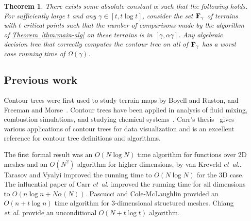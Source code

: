 \documentclass[11pt]{article}
\newcommand{\myparagraph}[1]{\paragraph{#1}}
\newtheorem{theorem}{Theorem}[section]
\theoremstyle{definition}
\newcommand{\bF}{{\bf F}}
\newcommand{\cC}{{\cal C}}
\newcommand{\MM}{\mathbb{M}}
\newcommand{\Thm}[1]{\hyperref[thm:#1]{Theorem~\ref*{thm:#1}}} %
\newcommand{\etal}{\textit{et~al.}\xspace}
\newcommand{\thmConst}{\gamma}
\begin{document}
\begin{theorem} 
\label{thm:main-lb}
There exists some absolute constant $\alpha$ such that the following holds.
For sufficiently large $t$ and any $\thmConst\in [t, t\log t]$, consider the set $\bF_\thmConst$ of terrains with $t$ critical points such that
the number of comparisons made by the algorithm of \Thm{main-alg} on these terrains is in $[\thmConst,\alpha \thmConst]$.
Any algebraic decision tree that correctly computes
the contour tree on all of $\bF_\thmConst$ has a worst case running time of $\Omega(\thmConst)$.
\end{theorem}
% 
% 

\subsection{Previous work}

Contour trees were first used to study terrain maps by Boyell and Ruston, and Freeman and Morse~\cite{BoRu63,FrMo67}.
Contour trees have been applied in analysis of fluid mixing, combustion simulations,
and studying chemical systems~\cite{LaBe+06,BrWe+10,BeWe+11,BrWe+11,MaGr+11}. Carr's thesis~\cite{c-tmi-04} gives various
applications of contour trees for data visualization and is an excellent reference for contour tree definitions and algorithms.

The first formal result was an $O(N\log N)$ time algorithm for functions over 2D 
meshes and an $O(N^2)$ algorithm for higher dimensions, by van Kreveld \etal \cite{kobps-ctsssit-97}. 
Tarasov and Vyalyi \cite{tv-cct-98} improved the running time to $O(N\log N)$ for the 3D case.
The influential paper of Carr \etal \cite{csa-cctad-03} improved the running time for all dimensions to $O(n\log n + N\alpha(N))$.
Pascucci and Cole-McLaughlin \cite{pc-ectls-02} provided an $O(n+t\log n)$ time algorithm for 
$3$-dimensional structured meshes. Chiang \etal \cite{cllr-sooscctmp-05} provide an unconditional $O(N+t\log t)$ algorithm.
\end{document}
